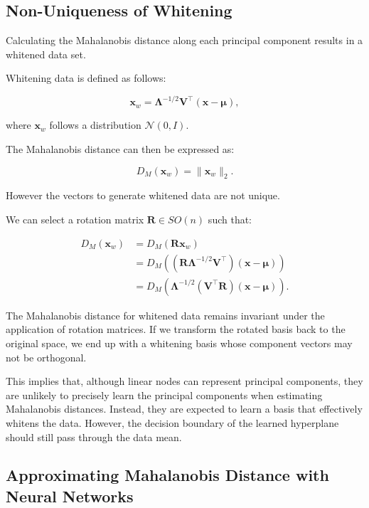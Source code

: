 \subsection{Non-Uniqueness of Whitening}

Calculating the Mahalanobis distance along each principal component results in a whitened data set. 

Whitening data is defined as follows:

\[
\mathbf{x}_w = \boldsymbol{\Lambda}^{-1/2} \mathbf{V}^\top (\mathbf{x} - \boldsymbol{\mu}),
\]

where \(\mathbf{x}_w\) follows a distribution \(\mathcal{N}(0, I)\).

The Mahalanobis distance can then be expressed as:

\[
D_M(\mathbf{x}_w) = \|\mathbf{x}_w\|_2.
\]

However the vectors to generate whitened data are not unique.

We can select a rotation matrix \(\mathbf{R} \in SO(n)\) such that:

\begin{align}
    D_M(\mathbf{x}_w) &= D_M(\mathbf{R} \mathbf{x}_w) \\
                      &= D_M\left( (\mathbf{R} \boldsymbol{\Lambda}^{-1/2} \mathbf{V}^\top) (\mathbf{x} - \boldsymbol{\mu}) \right) \\
                      &= D_M\left( \boldsymbol{\Lambda}^{-1/2} (\mathbf{V}^\top \mathbf{R}) (\mathbf{x} - \boldsymbol{\mu}) \right).
    \end{align}
    
The Mahalanobis distance for whitened data remains invariant under the application of rotation matrices. If we transform the rotated basis back to the original space, we end up with a whitening basis whose component vectors may not be orthogonal.

This implies that, although linear nodes can represent principal components, they are unlikely to precisely learn the principal components when estimating Mahalanobis distances. Instead, they are expected to learn a basis that effectively whitens the data. However, the decision boundary of the learned hyperplane should still pass through the data mean.

\subsection{Approximating Mahalanobis Distance with Neural Networks}


